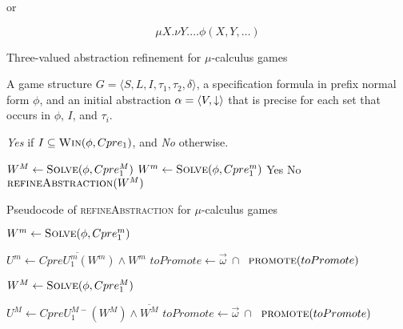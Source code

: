 or

\begin{equation}
\mu X. \nu Y. \ldots \phi(X, Y, \ldots)
\end{equation}

\begin{algorithm}
\caption{Three-valued abstraction refinement for $\mu$-calculus games}
\label{alg:generic_mu_calc}

\begin{algorithmic}[1]

     A game structure $G = \langle S, L, I, \tau_1, \tau_2, \delta \rangle$, a specification formula in prefix normal form $\phi$, and an initial abstraction $\alpha=\langle V, \mathord{\downarrow} \rangle$ that is precise for each set that occurs in $\phi$, $I$, and $\tau_i$.

     {\it Yes} if $I \subseteq \textsc{Win}(\phi, Cpre_1)$, and {\it No} otherwise.

    \Loop
    \State $W^M \gets \textsc{Solve}(\phi, Cpre_1^M)$
    \State $W^m \gets \textsc{Solve}(\phi, Cpre_1^m)$
            \State\Return Yes
            \State\Return No
        \Else       
            \State$\Call{refineAbstraction}{W^M}$
        \EndIf
    \EndLoop
\end{algorithmic}
\end{algorithm}

\begin{algorithm}

\caption{Pseudocode of \textsc{refineAbstraction} for $\mu$-calculus games}
\label{alg:refineAbstraction}

\begin{algorithmic}[1]


        \State $W^m \gets \textsc{Solve}(\phi, Cpre_1^m)$

        \State $U^m \gets \overline{CpreU_1^{m}(W^m)} \land W^m$
            \State $toPromote \gets \vec{\omega}~\cap~$
            \State $\Call{promote}{toPromote}$
        \Else
            \State {}
        \EndIf


        \State $W^M \gets \textsc{Solve}(\phi, Cpre_1^M)$

        \State $U^M \gets CpreU_1^{M-}(W^M) \land \overline{W^M}$
            \State $toPromote \gets \vec{\omega}~\cap~$
            \State $\Call{promote}{toPromote}$
        \Else
            \State {}
        \EndIf

    \EndIf
\EndFunction
\end{algorithmic}
\end{algorithm}

